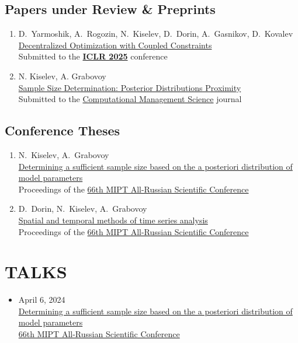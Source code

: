 \documentclass[11pt,a4paper]{moderncv}
\begin{document}
\subsection{Papers under Review \& Preprints}
\begin{enumerate}%
    \item D.~Yarmoshik, A.~Rogozin, N.~Kiselev, D.~Dorin, A.~Gasnikov, D.~Kovalev\\
    \href{https://arxiv.org/abs/2407.02020}{Decentralized Optimization with Coupled Constraints}\\
    Submitted to the \href{https://neurips.cc}{\textbf{ICLR 2025}} conference
    \item N. Kiselev, A. Grabovoy\\
    \href{https://github.com/kisnikser/Posterior-Distributions-Proximity}{Sample Size Determination: Posterior Distributions Proximity}\\
    Submitted to the \href{https://link.springer.com/journal/10287}{Computational Management Science} journal
\end{enumerate}
\subsection{Conference Theses}
\begin{enumerate}%
    \item N.~Kiselev, A.~Grabovoy\\
    \href{https://old.mipt.ru/upload/medialibrary/d79/fpmi.pdf}{Determining a sufficient sample size based on the a posteriori distribution of model parameters}\\
    Proceedings of the \href{https://conf.mipt.ru/}{66th MIPT All-Russian Scientific Conference}
    \item D.~Dorin, N.~Kiselev, A.~Grabovoy\\
    \href{https://old.mipt.ru/upload/medialibrary/d79/fpmi.pdf}{Spatial and temporal methods of time series analysis}\\
    Proceedings of the \href{https://conf.mipt.ru/}{66th MIPT All-Russian Scientific Conference}
\end{enumerate}

\section{TALKS}
\begin{itemize}
    \item April 6, 2024\\
    \href{https://www.youtube.com/live/WnIRaRl730A?si=q0eScgnDP2ZidCpK&t=1723}{Determining a sufficient sample size based on the a posteriori distribution of model parameters}\\
    \href{https://conf.mipt.ru/}{66th MIPT All-Russian Scientific Conference}
\end{itemize}
\end{document}
